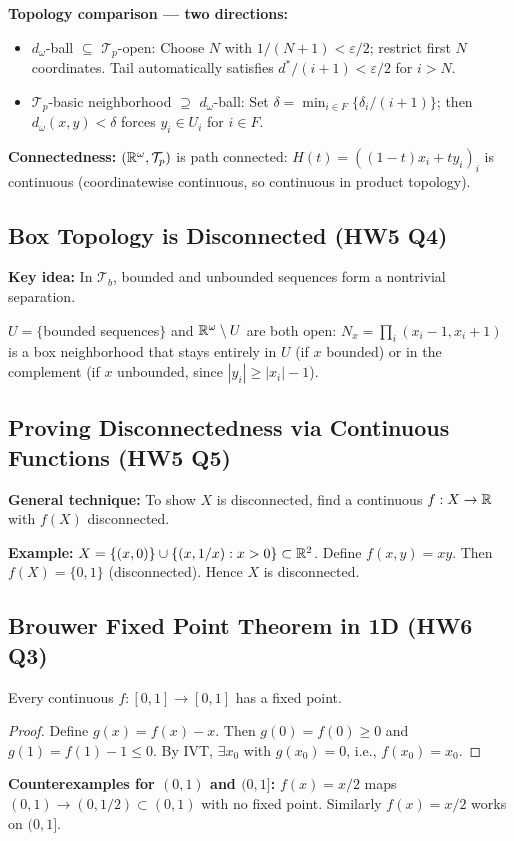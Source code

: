 \documentclass{article}
\begin{document}
\textbf{Topology comparison --- two directions:}
\begin{itemize}
  \item $d_\omega$-ball $\subseteq$ $\mathcal{T}_p$-open: Choose $N$
    with $1/(N+1) < \varepsilon/2$; restrict first $N$ coordinates.
    Tail automatically satisfies $d^*/(i+1) < \varepsilon/2$ for $i > N$.
  \item $\mathcal{T}_p$-basic neighborhood $\supseteq$
    $d_\omega$-ball: Set $\delta = \min_{i \in F}\{\delta_i/(i+1)\}$;
    then $d_\omega(x,y) < \delta$ forces $y_i \in U_i$ for $i \in F$.
\end{itemize}

\textbf{Connectedness:} $(\mathbb{R}^\omega, \mathcal{T}_p)$ is path
connected: $H(t) = ((1-t)x_i + ty_i)_i$ is continuous (coordinatewise
continuous, so continuous in product topology).

\subsection{Box Topology is Disconnected (HW5 Q4)}
\textbf{Key idea:} In $\mathcal{T}_b$, bounded and unbounded
sequences form a nontrivial separation.

$U = \{$bounded sequences$\}$ and $\mathbb{R}^\omega \setminus U$ are both open:
$N_x = \prod_i (x_i - 1, x_i + 1)$ is a box neighborhood that stays
entirely in $U$ (if $x$ bounded) or in the complement (if $x$
unbounded, since $|y_i| \ge |x_i| - 1$).

\subsection{Proving Disconnectedness via Continuous Functions (HW5 Q5)}
\textbf{General technique:} To show $X$ is disconnected, find a
continuous $f : X \to \mathbb{R}$ with $f(X)$ disconnected.

\textbf{Example:} $X = \{(x,0)\} \cup \{(x,1/x) : x > 0\} \subset \mathbb{R}^2$.
Define $f(x,y) = xy$. Then $f(X) = \{0, 1\}$ (disconnected). Hence
$X$ is disconnected.

\subsection{Brouwer Fixed Point Theorem in 1D (HW6 Q3)}
\begin{theorem}
  Every continuous $f : [0,1] \to [0,1]$ has a fixed point.
\end{theorem}
\begin{proof}
  Define $g(x) = f(x) - x$. Then $g(0) = f(0) \ge 0$ and $g(1) = f(1)
  - 1 \le 0$.
  By IVT, $\exists x_0$ with $g(x_0) = 0$, i.e., $f(x_0) = x_0$.
\end{proof}
\textbf{Counterexamples for $(0,1)$ and $(0,1]$:} $f(x) = x/2$ maps
$(0,1) \to (0,1/2) \subset (0,1)$ with no fixed point. Similarly
$f(x) = x/2$ works on $(0,1]$.
\end{document}
